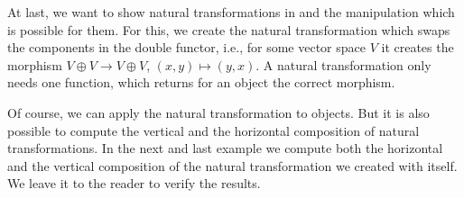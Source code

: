 \begin{small}

\end{small}

At last, we want to show natural transformations in \CapPkg and the manipulation which is possible for them. For this, we create the natural transformation which
swaps the components in the double functor, i.e., for some vector space $V$ it creates the morphism $V \oplus V \rightarrow V \oplus V$, $\left( x,y \right) \mapsto \left( y,x \right)$.
A natural transformation only needs one function, which returns for an object the correct morphism.



Of course, we can apply the natural transformation to objects. But it is also possible to compute the vertical and the horizontal composition of natural transformations.
In the next and last example we compute both the horizontal and the vertical composition of the natural transformation we created with itself. We leave it to the
reader to verify the results.

\begin{small}

\end{small}
